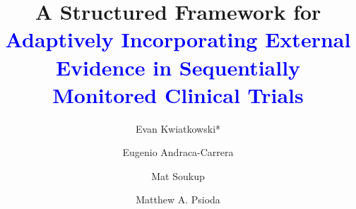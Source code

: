 \documentclass[AMA,STIX1COL,doublespace]{WileyNJD-v2}
\begin{document}
\title{A Structured Framework for \textcolor{blue}{Adaptively Incorporating External Evidence in Sequentially Monitored Clinical Trials}}

\author[1]{Evan Kwiatkowski*}

\author[2]{Eugenio Andraca-Carrera}

\author[2]{Mat Soukup}

\author[1]{Matthew A. Psioda}



\address[1]{, , }

\address[2]{Division of Biometrics VII, Office of Biostatistics, Center for Drug Evaluation and Research, US Food and Drug Administration, Silver Spring, Maryland, USA}




\end{document}
